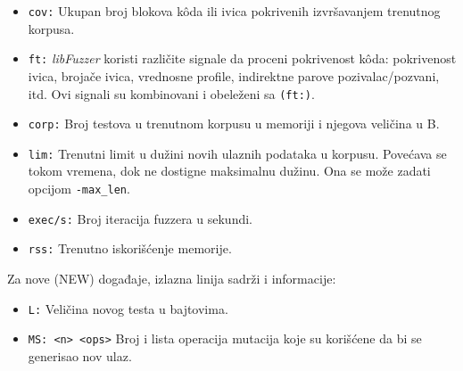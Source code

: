 \begin{itemize}
\item
  \texttt{cov:} Ukupan broj blokova kôda ili ivica pokrivenih izvršavanjem trenutnog korpusa.
\item
  \texttt{ft:} \emph{libFuzzer} koristi različite signale da proceni pokrivenost kôda: pokrivenost ivica, brojače ivica, vrednosne profile, indirektne parove pozivalac/pozvani, itd. Ovi signali su kombinovani i obeleženi sa \texttt{(ft:)}.
\item
  \texttt{corp:} Broj testova u trenutnom korpusu u memoriji i njegova veličina u B.
\item
  \texttt{lim:} Trenutni limit u dužini novih ulaznih podataka u korpusu. Povećava se tokom vremena, dok ne dostigne maksimalnu dužinu. Ona se može zadati opcijom \texttt{-max\_len}.
\item
  \texttt{exec/s:} Broj iteracija fuzzera u sekundi.
\item
  \texttt{rss:} Trenutno iskorišćenje memorije.
\end{itemize}

Za nove (NEW) događaje, izlazna linija sadrži i informacije:

\begin{itemize}
\item
  \texttt{L:} Veličina novog testa u bajtovima.
\item
  \texttt{MS:\ \textless{}n\textgreater{}\ \textless{}ops\textgreater{}} Broj i lista operacija mutacija koje su korišćene da bi se generisao nov ulaz.
\end{itemize}

